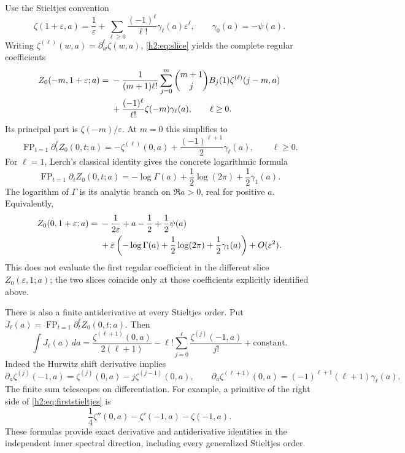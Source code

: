 Use the Stieltjes convention
\[
 \zeta(1+\varepsilon,a)=\frac1\varepsilon
       +\sum_{\ell\ge0}\frac{(-1)^\ell}{\ell!}
                         \gamma_\ell(a)\varepsilon^\ell,
 \qquad \gamma_0(a)=-\psi(a).
\]
Writing $\zeta^{(\ell)}(w,a)=\partial_w^\ell\zeta(w,a)$,
\eqref{h2:eq:slice} yields the complete regular coefficients
\begin{align}
 [\varepsilon^\ell]Z_0(-m,1+\varepsilon;a)
 ={}&-\frac1{(m+1)\ell!}\sum_{j=0}^{m}
       \binom{m+1}{j}B_j(1)\zeta^{(\ell)}(j-m,a)
       \notag\\
 &+\frac{(-1)^\ell}{\ell!}\zeta(-m)\gamma_\ell(a),
 \qquad \ell\ge0.\label{h2:eq:slicejets}
\end{align}
Its principal part is $\zeta(-m)/\varepsilon$. At $m=0$ this simplifies to
\begin{equation}\label{h2:eq:allstieltjes}
 \boxed{\displaystyle
 \operatorname{FP}_{t=1}\partial_t^\ell Z_0(0,t;a)
   =-\zeta^{(\ell)}(0,a)
           +\frac{(-1)^{\ell+1}}2\gamma_\ell(a),
 \qquad \ell\ge0.}
\end{equation}
For $\ell=1$, Lerch's classical identity
\cite{DLMFHzeta} gives the concrete logarithmic formula
\begin{equation}\label{h2:eq:firststieltjes}
 \boxed{\displaystyle
 \operatorname{FP}_{t=1}\partial_t Z_0(0,t;a)
   =-\log\Gamma(a)+\frac12\log(2\pi)+\frac12\gamma_1(a).}
\end{equation}
The logarithm of $\Gamma$ is its analytic branch on $\Re a>0$,
real for positive $a$. Equivalently,
\begin{align}
 Z_0(0,1+\varepsilon;a)
  ={}&-\frac1{2\varepsilon}+a-\frac12+\frac12\psi(a)\notag\\
  &+\varepsilon\left(-\log\Gamma(a)+\frac12\log(2\pi)
                                     +\frac12\gamma_1(a)\right)
       +O(\varepsilon^2).\label{h2:eq:Z0next}
\end{align}
This does not evaluate the first regular coefficient in the different
slice $Z_0(\varepsilon,1;a)$; the two slices coincide only at those
coefficients explicitly identified above.

There is also a finite antiderivative at every Stieltjes order. Put
$J_\ell(a)=\operatorname{FP}_{t=1}\partial_t^\ell Z_0(0,t;a)$.
Then
\begin{equation}\label{h2:eq:primitive}
 \boxed{\displaystyle
 \int J_\ell(a)\,da
  =\frac{\zeta^{(\ell+1)}(0,a)}{2(\ell+1)}
      -\ell!\sum_{j=0}^{\ell}
                  \frac{\zeta^{(j)}(-1,a)}{j!}
       +\text{constant}.}
\end{equation}
Indeed the Hurwitz shift derivative implies
\[
 \partial_a\zeta^{(j)}(-1,a)
     =\zeta^{(j)}(0,a)-j\zeta^{(j-1)}(0,a),\qquad
 \partial_a\zeta^{(\ell+1)}(0,a)
     =(-1)^{\ell+1}(\ell+1)\gamma_\ell(a).
\]
The finite sum telescopes on differentiation. For example, a primitive
of the right side of \eqref{h2:eq:firststieltjes} is
\[
 \frac14\zeta''(0,a)-\zeta'(-1,a)-\zeta(-1,a).
\]
These formulas provide exact derivative and antiderivative identities
in the independent inner spectral direction, including every
generalized Stieltjes order.


